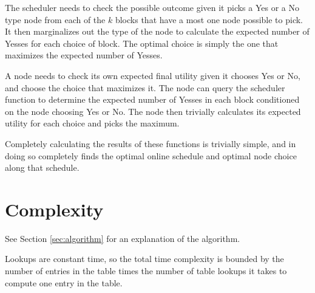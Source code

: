 \documentclass{article}
\begin{document}
The scheduler needs to check the possible outcome given it picks a Yes
or a No type node from each of the $k$ blocks that have a most one
node possible to pick. It then marginalizes out the type of the node
to calculate the expected number of Yesses for each choice of
block. The optimal choice is simply the one that maximizes the
expected number of Yesses.

A node needs to check its own expected final utility given it chooses
Yes or No, and choose the choice that maximizes it. The node can query
the scheduler function to determine the expected number of Yesses in
each block conditioned on the node choosing Yes or No. The node then
trivially calculates its expected utility for each choice and picks
the maximum.

Completely calculating the results of these functions is trivially
simple, and in doing so completely finds the optimal online schedule
and optimal node choice along that schedule.

\section{Complexity}

See Section \ref{sec:algorithm} for an explanation of the algorithm.

Lookups are constant time, so the total time complexity is 
 bounded by the number of entries in the table times the number of
table lookups it takes to compute one entry in the table.
\end{document}
